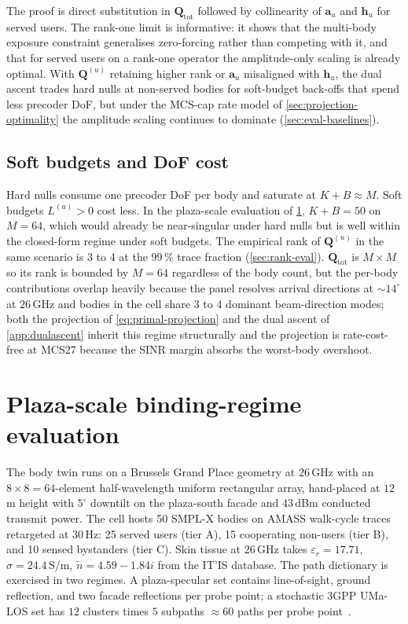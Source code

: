 \documentclass[journal,twocolumn,10pt]{IEEEtran}
\theoremstyle{plain}
\theoremstyle{remark}
\newcommand{\hh}{\mathbf{h}}
\newcommand{\Qmat}{\mathbf{Q}}
\newcommand{\ntilde}{\tilde{n}}
\begin{document}
The proof is direct substitution in $\Qmat_{\mathrm{tot}}$ followed
by collinearity of $\mathbf{a}_u$ and $\hh_u$ for served users. The
rank-one limit is informative: it shows that the multi-body
exposure constraint generalises zero-forcing rather than competing
with it, and that for served users on a rank-one operator the
amplitude-only scaling is already optimal. With $\Qmat^{(u)}$
retaining higher rank or $\mathbf{a}_u$ misaligned with $\hh_u$,
the dual ascent trades hard nulls at non-served bodies for
soft-budget back-offs that spend less precoder DoF, but under the
MCS-cap rate model of \cref{sec:projection-optimality} the
amplitude scaling continues to dominate (\cref{sec:eval-baselines}).

\subsection{Soft budgets and DoF cost}\label{sec:softbudget}

Hard nulls consume one precoder DoF per body and saturate at
$K + B \approx M$. Soft budgets $L^{(u)} > 0$ cost less. In the
plaza-scale evaluation of \cref{sec:eval}, $K + B = 50$ on $M = 64$,
which would already be near-singular under hard nulls but is well
within the closed-form regime under soft budgets. The empirical rank
of $\Qmat^{(u)}$ in the same scenario is 3 to 4 at the $99\,\%$
trace fraction (\cref{sec:rank-eval}). $\Qmat_{\mathrm{tot}}$ is
$M\times M$ so its rank is bounded by $M = 64$ regardless of the
body count, but the per-body contributions overlap heavily because
the panel resolves arrival directions at $\sim 14^\circ$ at
$26\,$GHz and bodies in the cell share $3$ to $4$ dominant
beam-direction modes; both the projection of
\cref{eq:primal-projection} and the dual ascent of
\cref{app:dualascent} inherit this regime structurally and the
projection is rate-cost-free at MCS27 because the SINR margin
absorbs the worst-body overshoot.


\section{Plaza-scale binding-regime evaluation}\label{sec:eval}

The body twin runs on a Brussels Grand Place geometry at $26\,$GHz
with an $8 \times 8 = 64$-element half-wavelength uniform rectangular
array, hand-placed at $12\,$m height with $5^\circ$ downtilt on the
plaza-south facade and $43\,$dBm conducted transmit power. The cell
hosts 50 SMPL-X bodies on AMASS walk-cycle traces retargeted at
$30\,$Hz: 25 served users (tier A), 15 cooperating non-users
(tier B), and 10 sensed bystanders (tier C). Skin tissue at
$26\,$GHz takes
$\varepsilon_r = 17.71$, $\sigma = 24.4\,$S/m,
$\ntilde = 4.59 - 1.84i$ from the IT'IS database. The path
dictionary is exercised in two regimes. A plaza-specular set
contains line-of-sight, ground reflection, and two facade reflections
per probe point; a stochastic 3GPP UMa-LOS set has $12$ clusters
times $5$ subpaths $\approx 60$ paths per probe
point~\cite{TR38901}.
\end{document}
